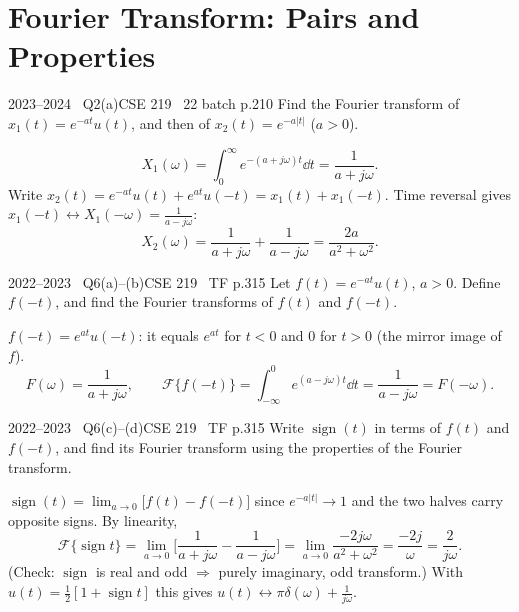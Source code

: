 \renewcommand{\teacherTag}{ANIK SIR \textbullet\ LECTURES 8--10}
\chapter{Fourier Transform: Pairs and Properties}


\begin{qcard}{2023--2024 \textbullet\ Q2(a)}{CSE 219 \textbullet\ 22 batch p.2}{10}
Find the Fourier transform of $x_1(t)=e^{-at}u(t)$, and then of $x_2(t)=e^{-a|t|}$ ($a>0$).
\end{qcard}
\begin{solution}
\[X_1(\omega)=\int_0^\infty e^{-(a+j\omega)t}\dd t=\frac1{a+j\omega}.\]
Write $x_2(t)=e^{-at}u(t)+e^{at}u(-t)=x_1(t)+x_1(-t)$. Time reversal gives $x_1(-t)\leftrightarrow X_1(-\omega)=\frac1{a-j\omega}$:
\[X_2(\omega)=\frac1{a+j\omega}+\frac1{a-j\omega}=\frac{2a}{a^2+\omega^2}.\]
\end{solution}

\begin{qcard}{2022--2023 \textbullet\ Q6(a)--(b)}{CSE 219 \textbullet\ TF p.3}{15}
Let $f(t)=e^{-at}u(t)$, $a>0$. Define $f(-t)$, and find the Fourier transforms of $f(t)$ and $f(-t)$.
\end{qcard}
\begin{solution}
$f(-t)=e^{at}u(-t)$: it equals $e^{at}$ for $t<0$ and $0$ for $t>0$ (the mirror image of $f$).
\[F(\omega)=\frac1{a+j\omega},\qquad \mathcal F\{f(-t)\}=\int_{-\infty}^0e^{(a-j\omega)t}\dd t=\frac1{a-j\omega}=F(-\omega).\]
\end{solution}

\begin{qcard}{2022--2023 \textbullet\ Q6(c)--(d)}{CSE 219 \textbullet\ TF p.3}{15}
Write $\operatorname{sign}(t)$ in terms of $f(t)$ and $f(-t)$, and find its Fourier transform using the properties of the Fourier transform.
\end{qcard}
\begin{solution}
$\operatorname{sign}(t)=\lim_{a\to0}\big[f(t)-f(-t)\big]$ since $e^{-a|t|}\to1$ and the two halves carry opposite signs. By linearity,
\[\mathcal F\{\operatorname{sign}t\}=\lim_{a\to0}\Big[\frac1{a+j\omega}-\frac1{a-j\omega}\Big]=\lim_{a\to0}\frac{-2j\omega}{a^2+\omega^2}=\frac{-2j}{\omega}=\frac{2}{j\omega}.\]
(Check: $\operatorname{sign}$ is real and odd $\Rightarrow$ purely imaginary, odd transform.) With $u(t)=\frac12[1+\operatorname{sign}t]$ this gives $u(t)\leftrightarrow\pi\delta(\omega)+\frac1{j\omega}$.
\end{solution}

